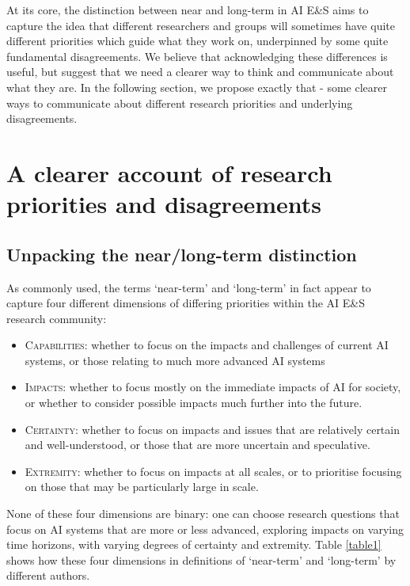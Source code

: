 \documentclass[sigconf]{acmart}
\begin{document}
At its core, the distinction between near and long-term in AI E\&S aims to capture the idea that different researchers and groups will sometimes have quite different priorities which guide what they work on, underpinned by some quite fundamental disagreements. We believe that acknowledging these differences is useful, but suggest that we need a clearer way to think and communicate about what they are. In the following section, we propose exactly that - some clearer ways to communicate about different research priorities and underlying disagreements.

\section{A clearer account of research priorities and disagreements}

\subsection{Unpacking the near/long-term distinction}

As commonly used, the terms `near-term' and `long-term' in fact appear to capture four different dimensions of differing priorities within the AI E\&S research community:

\begin{itemize}
    \item[] \textsc{Capabilities}: whether to focus on the impacts and challenges of current AI systems, or those relating to much more advanced AI systems
    \item[] \textsc{Impacts}: whether to focus mostly on the immediate impacts of AI for society, or whether to consider possible impacts much further into the future.
    \item[] \textsc{Certainty}: whether to focus on impacts and issues that are relatively certain and well-understood, or those that are more uncertain and speculative.
    \item[] \textsc{Extremity}: whether to focus on impacts at all scales, or to prioritise focusing on those that may be particularly large in scale.
\end{itemize}



None of these four dimensions are binary: one can choose research questions that focus on AI systems that are more or less advanced, exploring impacts on varying time horizons, with varying degrees of certainty and extremity. Table \ref{table1} shows how these four dimensions in definitions of `near-term' and `long-term' by different authors.
\end{document}
